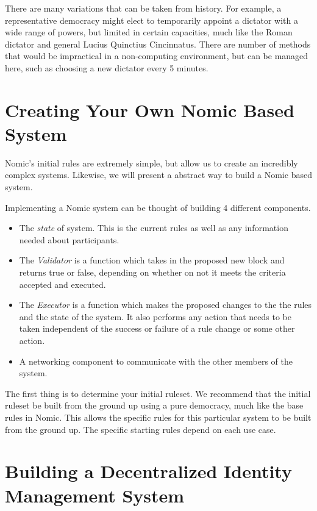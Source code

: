 \documentclass[11pt,letterpaper]{article}
\begin{document}
	There are many variations that can be taken from history.  
	For example, a representative democracy might elect to temporarily appoint a dictator with a wide range of powers, but limited in certain capacities, much like the Roman dictator and general Lucius Quinctius Cincinnatus.
	There are number of methods that would be impractical  in a non-computing  environment, but can be managed here, such as choosing a new dictator every 5 minutes.
	
	
	\section{Creating Your Own Nomic Based System}
	
	
	Nomic's initial rules are extremely simple, but allow us to create an incredibly complex systems.
	Likewise, we will present a abstract way to build a Nomic based system.
	
	Implementing a Nomic system can be thought of building 4 different components.
	\begin{itemize}
		\item The \textit{state} of system.  This is the current rules as well as any information needed about participants.
		\item The \textit{Validator}  is  a function which takes in the proposed new block and  returns true or false, depending on whether on not it meets the criteria accepted and executed.
		\item The \textit{Executor} is a function which makes the proposed changes to the the rules and the state of the system.  It also performs any action that needs to be taken independent of the success or failure of a rule change or some other action.
		\item A networking component to communicate with the other members of the system.
	\end{itemize}
	
	The first thing is to determine your initial ruleset.
	We recommend that the initial ruleset be built from the ground up using a pure democracy, much like the base rules in Nomic.
	This allows the specific rules for this particular system to be built from the ground up.
	The specific starting rules depend on each use case.
	
	
	\section{Building a Decentralized Identity Management System}
	
\end{document}
